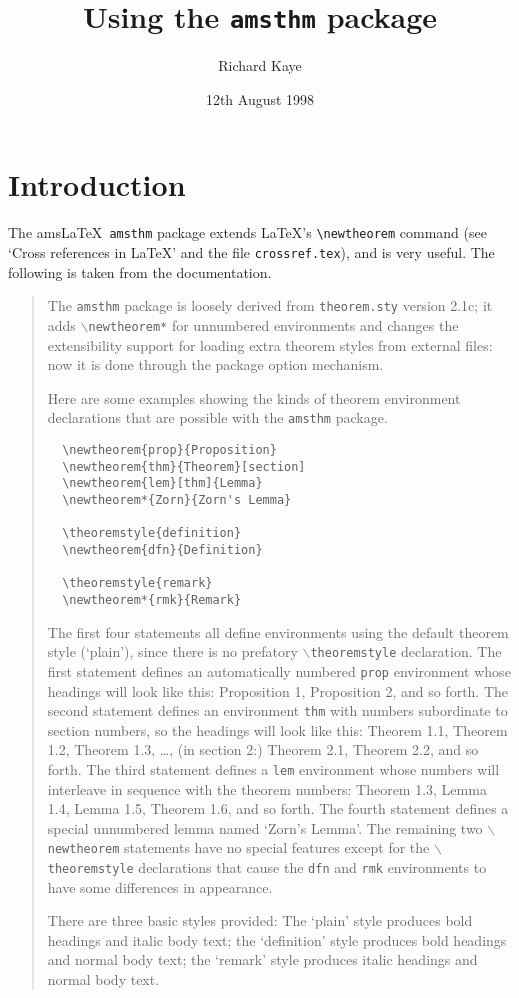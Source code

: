 \documentclass[a4paper]{article}
\title{Using the \texttt{amsthm} package}
\author{Richard Kaye}
\date{12th August 1998}
\newcommand\cn[1]{$\mathtt\backslash$\texttt{#1}}
\theoremstyle{definition}
\theoremstyle{remark}
\theoremstyle{remark}
\begin{document}
\maketitle
\section{Introduction}

The ams\LaTeX\ \verb|amsthm| package extends \LaTeX's \verb|\newtheorem| command
(see `Cross references in \LaTeX' and the file \verb|crossref.tex|), and is
very useful.  The following is taken from the documentation.
\begin{quotation}
The \texttt{amsthm} package is loosely derived from \texttt{theorem.sty}
    version 2.1c; it adds \cn{newtheorem*} for unnumbered environments
    and changes the extensibility support for loading extra theorem
    styles from external files: now it is done through the package
    option mechanism.

Here are some examples showing the kinds of theorem environment
    declarations that are possible with the \verb|amsthm| package.
\begin{verbatim}
  \newtheorem{prop}{Proposition}
  \newtheorem{thm}{Theorem}[section]
  \newtheorem{lem}[thm]{Lemma}
  \newtheorem*{Zorn}{Zorn's Lemma}
  
  \theoremstyle{definition}
  \newtheorem{dfn}{Definition}

  \theoremstyle{remark}
  \newtheorem*{rmk}{Remark}
\end{verbatim}

The first four statements all define environments using the default
     theorem style (`plain'), since there is no prefatory
     \cn{theoremstyle} declaration. The first statement defines an
     automatically numbered \texttt{prop} environment whose headings will
     look like this: Proposition 1, Proposition 2, and so forth. The
     second statement defines an environment \texttt{thm} with numbers
     subordinate to section numbers, so the headings will look like
     this: Theorem 1.1, Theorem 1.2, Theorem 1.3, \dots, (in section 2:)
     Theorem 2.1, Theorem 2.2, and so forth. The third statement defines
     a \texttt{lem} environment whose numbers will interleave in sequence
     with the theorem numbers: Theorem 1.3, Lemma 1.4, Lemma 1.5,
     Theorem 1.6, and so forth. The fourth statement defines a special
     unnumbered lemma named `Zorn's Lemma'. The remaining two
     \cn{newtheorem} statements have no special features except for the
     \cn{theoremstyle} declarations that cause the \texttt{dfn} and
     \texttt{rmk} environments to have some differences in appearance.

There are three basic styles provided: The `plain' style produces
     bold headings and italic body text; the `definition' style produces
     bold headings and normal body text; the `remark' style produces
     italic headings and normal body text.
\end{quotation} 
\end{document}

